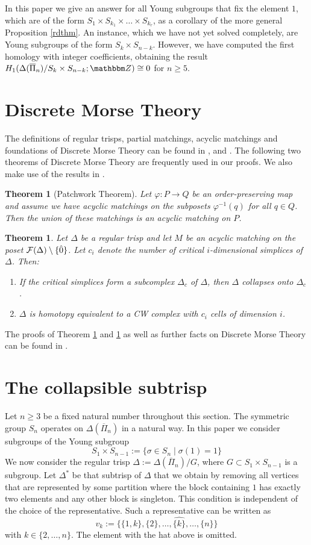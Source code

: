 \documentclass{elsarticle}
\newtheorem{thm}[df]{Theorem}
\def\Z{\mathbbm Z}
\begin{document}
In this paper we give an answer for all Young subgroups that fix the element $1$, which are of the form $S_1\times S_{k_1}\times\dots\times S_{k_r}$, as a corollary of the more general Proposition \ref{rdthm}. An instance, which we have not yet solved completely, are Young subgroups of the form $S_k\times S_{n-k}$. However, we have computed the first homology with integer coefficients, obtaining the result $H_1(\Delta(\overline{\Pi}_n)/S_k\times S_{n-k};\Z)\cong 0$ for $n\geq 5$.
\section{Discrete Morse Theory}
The definitions of regular trisps, partial matchings, acyclic matchings and foundations of Discrete Morse Theory can be found in \cite{forman}, \cite{clmap} and \cite{buch}. The following two theorems of Discrete Morse Theory are frequently used in our proofs. We also make use of the results in \cite{clmap}.
\begin{thm}[Patchwork Theorem]
\label{patchwork}
Let $\varphi:P\longrightarrow Q$ be an order-preserving map and assume we have acyclic matchings on the subposets $\varphi^{-1}(q)$ for all $q\in Q$. Then the union of these matchings is an acyclic matching on $P$.
\end{thm}
\begin{thm}%
\label{morsemain}
Let $\Delta$ be a regular trisp and let $M$ be an acyclic matching on the poset ${\cal F}(\Delta)\setminus\{\hat{0}\}$. Let $c_i$ denote the number of critical $i$-dimensional simplices of $\Delta$. Then:
\begin{enumerate}
\item If the critical simplices form a subcomplex $\Delta_c$ of $\Delta$, then $\Delta$ collapses onto $\Delta_c$.
\item $\Delta$ is homotopy equivalent to a CW complex with $c_i$ cells of dimension $i$.
\end{enumerate}
\end{thm}
The proofs of Theorem \ref{patchwork} and \ref{morsemain} as well as further facts on Discrete Morse Theory can be found in \cite[Chapter 11]{buch}.
\section{The collapsible subtrisp}
\label{allgemein}
Let $n\geq 3$ be a fixed natural number throughout this section. The symmetric group $S_n$ operates on $\Delta(\overline{\Pi}_n)$ in a natural way. In this paper we consider subgroups of the Young subgroup
\[S_1\times S_{n-1}:=\{\sigma\in S_n\mid\sigma(1)=1\}\]
We now consider the regular trisp $\Delta:=\Delta(\overline{\Pi}_n)/G$, where $G\subset S_1\times S_{n-1}$ is a subgroup. Let $\Delta^*$ be that subtrisp of $\Delta$ that we obtain by removing all vertices that are represented by some partition where the block containing $1$ has exactly two elements and any other block is singleton. This condition is independent of the choice of the representative. Such a representative can be written as
\[
v_k:=\{\{1,k\},\{2\},\dots,\widehat{\{k\}},\dots,\{n\}\}
\]
with $k\in\{2,\ldots, n\}$. The element with the hat above is omitted.
\end{document}
